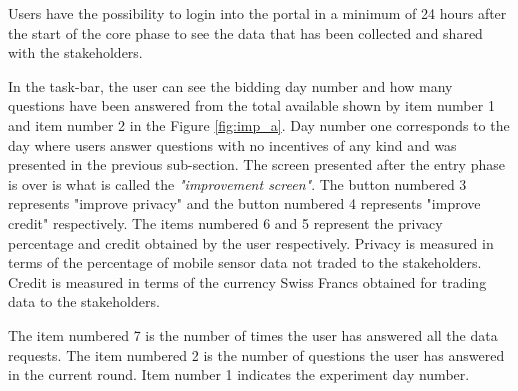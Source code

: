 Users have the possibility to login into the portal in a minimum of 24 hours after the start of the core phase to see the data that has been collected and shared with the stakeholders. 

In the task-bar, the user can see the bidding day number and how many questions have been answered from the total available shown by item number 1 and item number 2 in the Figure \ref{fig:imp_a}. Day number one
corresponds to the day where users answer questions with no incentives of any kind and was presented in the previous sub-section. The screen presented after the entry phase is over is what is called the \textit{"improvement screen"}. 
The button numbered 3
represents "improve privacy" and the button numbered 4 represents "improve credit" respectively. The items numbered 6 and 5 represent the privacy percentage and credit obtained by the user respectively. Privacy is measured in terms of the percentage of mobile sensor data not traded to the stakeholders. Credit is measured in terms of the currency Swiss Francs obtained for trading data to the stakeholders. 

The item numbered 7 is the number of times the user has answered all the data requests. The item numbered 2 is the number of questions the user has answered in the current round. Item number 1 indicates the experiment day number.



